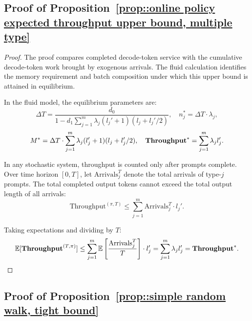 \subsection{Proof of Proposition~\ref{prop::online policy expected throughput upper bound, multiple type}}
\label{appendix:proof_throughput_upper_bound}

\begin{proof}
The proof compares completed decode-token service with the cumulative decode-token work brought by exogenous arrivals. The fluid calculation identifies the memory requirement and batch composition under which this upper bound is attained in equilibrium.

In the fluid model, the equilibrium parameters are:
$$\Delta T = \frac{d_0}{1 - d_1\sum_{j=1}^m \lambda_j(l_j'+1)(l_j + l_j'/2)}, \quad n_j^* = \Delta T \cdot \lambda_j,$$
$$M^* = \Delta T \cdot \sum_{j=1}^m \lambda_j(l_j'+1)(l_j + l_j'/2), \quad \textbf{Throughput}^* = \sum_{j=1}^m \lambda_j l_j'.$$

In any stochastic system, throughput is counted only after prompts complete. Over time horizon $[0,T]$, let $\text{Arrivals}_j^T$ denote the total arrivals of type-$j$ prompts. The total completed output tokens cannot exceed the total output length of all arrivals:
$$\text{Throughput}^{(\pi,T)} \leq \sum_{j=1}^m \text{Arrivals}_j^T \cdot l_j'.$$

Taking expectations and dividing by $T$:
$$\mathbb{E}[\textbf{Throughput}^{(T,\pi)}] \leq \sum_{j=1}^m \mathbb{E}\left[\frac{\text{Arrivals}_j^T}{T}\right] \cdot l_j' = \sum_{j=1}^m \lambda_j l_j' = \textbf{Throughput}^*.$$
\end{proof}

\subsection{Proof of Proposition~\ref{prop::simple random walk, tight bound}}
\label{appendix:proof_boundary_delay_lower_bound}


